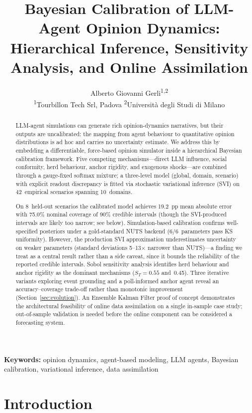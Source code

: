\documentclass[12pt]{article}
\title{Bayesian Calibration of LLM-Agent Opinion Dynamics:\\Hierarchical Inference, Sensitivity Analysis, and Online Assimilation}
\author{Alberto Giovanni Gerli\textsuperscript{1,2} \\[6pt]
{\small \textsuperscript{1}Tourbillon Tech Srl, Padova \qquad
\textsuperscript{2}Universit\`a degli Studi di Milano}}
\date{}
\begin{document}
\maketitle

\noindent\textbf{Keywords:} opinion dynamics, agent-based modeling, LLM agents, Bayesian calibration, variational inference, data assimilation

\begin{abstract}
LLM-agent simulations can generate rich opinion-dynamics narratives, but their outputs are uncalibrated: the mapping from agent behaviour to quantitative opinion distributions is ad hoc and carries no uncertainty estimate. We address this by embedding a differentiable, force-based opinion simulator inside a hierarchical Bayesian calibration framework. Five competing mechanisms---direct LLM influence, social conformity, herd behaviour, anchor rigidity, and exogenous shocks---are combined through a gauge-fixed softmax mixture; a three-level model (global, domain, scenario) with explicit readout discrepancy is fitted via stochastic variational inference (SVI) on 42~empirical scenarios spanning 10~domains.

On 8~held-out scenarios the calibrated model achieves 19.2~pp mean absolute error with 75.0\% nominal coverage of 90\% credible intervals (though the SVI-produced intervals are likely too narrow; see below). Simulation-based calibration confirms well-specified posteriors under a gold-standard NUTS backend (6/6~parameters pass KS uniformity). However, the production SVI approximation underestimates uncertainty on weaker parameters (standard deviations 5--13$\times$ narrower than NUTS)---a finding we treat as a central result rather than a side caveat, since it bounds the reliability of the reported credible intervals. Sobol sensitivity analysis identifies herd behaviour and anchor rigidity as the dominant mechanisms ($S_T = 0.55$ and~0.45). Three iterative variants exploring event grounding and a poll-informed anchor agent reveal an accuracy--coverage trade-off rather than monotonic improvement (Section~\ref{sec:evolution}). An Ensemble Kalman Filter proof of concept demonstrates the architectural feasibility of online data assimilation on a single in-sample case study; out-of-sample validation is needed before the online component can be considered a forecasting system.
\end{abstract}

\section{Introduction}
\end{document}
